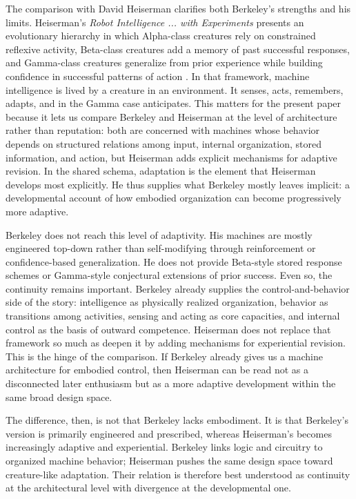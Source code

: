 \documentclass[11pt]{article}
\begin{document}
The comparison with David Heiserman clarifies both Berkeley's strengths and his limits. Heiserman's \emph{Robot Intelligence ... with Experiments} presents an evolutionary hierarchy in which Alpha-class creatures rely on constrained reflexive activity, Beta-class creatures add a memory of past successful responses, and Gamma-class creatures generalize from prior experience while building confidence in successful patterns of action \citep[pp.~18--20]{heiserman1981robot}. In that framework, machine intelligence is lived by a creature in an environment. It senses, acts, remembers, adapts, and in the Gamma case anticipates. This matters for the present paper because it lets us compare Berkeley and Heiserman at the level of architecture rather than reputation: both are concerned with machines whose behavior depends on structured relations among input, internal organization, stored information, and action, but Heiserman adds explicit mechanisms for adaptive revision. In the shared schema, adaptation is the element that Heiserman develops most explicitly. He thus supplies what Berkeley mostly leaves implicit: a developmental account of how embodied organization can become progressively more adaptive.

Berkeley does not reach this level of adaptivity. His machines are mostly engineered top-down rather than self-modifying through reinforcement or confidence-based generalization. He does not provide Beta-style stored response schemes or Gamma-style conjectural extensions of prior success. Even so, the continuity remains important. Berkeley already supplies the control-and-behavior side of the story: intelligence as physically realized organization, behavior as transitions among activities, sensing and acting as core capacities, and internal control as the basis of outward competence. Heiserman does not replace that framework so much as deepen it by adding mechanisms for experiential revision. This is the hinge of the comparison. If Berkeley already gives us a machine architecture for embodied control, then Heiserman can be read not as a disconnected later enthusiasm but as a more adaptive development within the same broad design space.

The difference, then, is not that Berkeley lacks embodiment. It is that Berkeley's version is primarily engineered and prescribed, whereas Heiserman's becomes increasingly adaptive and experiential. Berkeley links logic and circuitry to organized machine behavior; Heiserman pushes the same design space toward creature-like adaptation. Their relation is therefore best understood as continuity at the architectural level with divergence at the developmental one.
\end{document}
